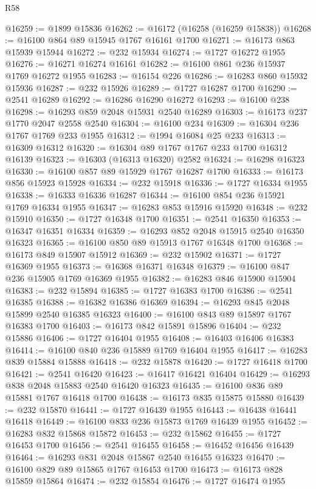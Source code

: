 \begin{lexlean}{R58}
\begin{coremodule}
@16259 := @1899 @15836
@16262 := @16172 (@16258 (@16259 @15838))
@16268 := @16100 @864 @89 @15945 @1767 @16161 @1700
@16271 := @16173 @863 @15939 @15944
@16272 := @232 @15934
@16274 := @1727 @16272 @1955
@16276 := @16271 @16274 @16161
@16282 := @16100 @861 @236 @15937 @1769 @16272 @1955
@16283 := @16154 @226
@16286 := @16283 @860 @15932 @15936
@16287 := @232 @15926
@16289 := @1727 @16287 @1700
@16290 := @2541 @16289
@16292 := @16286 @16290 @16272
@16293 := @16100 @238
@16298 := @16293 @859 @2048 @15931 @2540 @16289
@16303 := @16173 @237 @1770 @2047 @2558 @2540
@16304 := @16100 @234
@16309 := @16304 @236 @1767 @1769 @233 @1955
@16312 := @1994 @16084 @25 @233
@16313 := @16309 @16312
@16320 := @16304 @89 @1767 @1767 @233 @1700 @16312 @16139
@16323 := @16303 (@16313 @16320) @2582
@16324 := @16298 @16323
@16330 := @16100 @857 @89 @15929 @1767 @16287 @1700
@16333 := @16173 @856 @15923 @15928
@16334 := @232 @15918
@16336 := @1727 @16334 @1955
@16338 := @16333 @16336 @16287
@16344 := @16100 @854 @236 @15921 @1769 @16334 @1955
@16347 := @16283 @853 @15916 @15920
@16348 := @232 @15910
@16350 := @1727 @16348 @1700
@16351 := @2541 @16350
@16353 := @16347 @16351 @16334
@16359 := @16293 @852 @2048 @15915 @2540 @16350 @16323
@16365 := @16100 @850 @89 @15913 @1767 @16348 @1700
@16368 := @16173 @849 @15907 @15912
@16369 := @232 @15902
@16371 := @1727 @16369 @1955
@16373 := @16368 @16371 @16348
@16379 := @16100 @847 @236 @15905 @1769 @16369 @1955
@16382 := @16283 @846 @15900 @15904
@16383 := @232 @15894
@16385 := @1727 @16383 @1700
@16386 := @2541 @16385
@16388 := @16382 @16386 @16369
@16394 := @16293 @845 @2048 @15899 @2540 @16385 @16323
@16400 := @16100 @843 @89 @15897 @1767 @16383 @1700
@16403 := @16173 @842 @15891 @15896
@16404 := @232 @15886
@16406 := @1727 @16404 @1955
@16408 := @16403 @16406 @16383
@16414 := @16100 @840 @236 @15889 @1769 @16404 @1955
@16417 := @16283 @839 @15884 @15888
@16418 := @232 @15878
@16420 := @1727 @16418 @1700
@16421 := @2541 @16420
@16423 := @16417 @16421 @16404
@16429 := @16293 @838 @2048 @15883 @2540 @16420 @16323
@16435 := @16100 @836 @89 @15881 @1767 @16418 @1700
@16438 := @16173 @835 @15875 @15880
@16439 := @232 @15870
@16441 := @1727 @16439 @1955
@16443 := @16438 @16441 @16418
@16449 := @16100 @833 @236 @15873 @1769 @16439 @1955
@16452 := @16283 @832 @15868 @15872
@16453 := @232 @15862
@16455 := @1727 @16453 @1700
@16456 := @2541 @16455
@16458 := @16452 @16456 @16439
@16464 := @16293 @831 @2048 @15867 @2540 @16455 @16323
@16470 := @16100 @829 @89 @15865 @1767 @16453 @1700
@16473 := @16173 @828 @15859 @15864
@16474 := @232 @15854
@16476 := @1727 @16474 @1955

\end{coremodule}
\end{lexlean}
